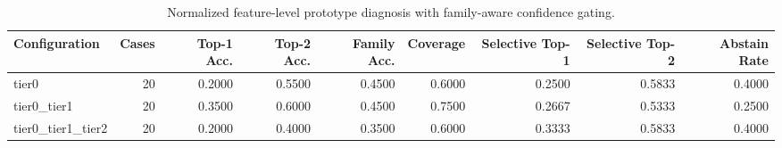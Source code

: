 \begin{table}[t]
\centering
\caption{Normalized feature-level prototype diagnosis with family-aware confidence gating.}
\label{tab:dice_stressor_hierarchical_diagnosis}
\footnotesize
\begin{tabular}{lrrrrrrrr}
\toprule
Configuration & Cases & Top-1 Acc. & Top-2 Acc. & Family Acc. & Coverage & Selective Top-1 & Selective Top-2 & Abstain Rate \\
\midrule
tier0 & 20 & 0.2000 & 0.5500 & 0.4500 & 0.6000 & 0.2500 & 0.5833 & 0.4000 \\
tier0_tier1 & 20 & 0.3500 & 0.6000 & 0.4500 & 0.7500 & 0.2667 & 0.5333 & 0.2500 \\
tier0_tier1_tier2 & 20 & 0.2000 & 0.4000 & 0.3500 & 0.6000 & 0.3333 & 0.5833 & 0.4000 \\
\bottomrule
\end{tabular}

\end{table}
